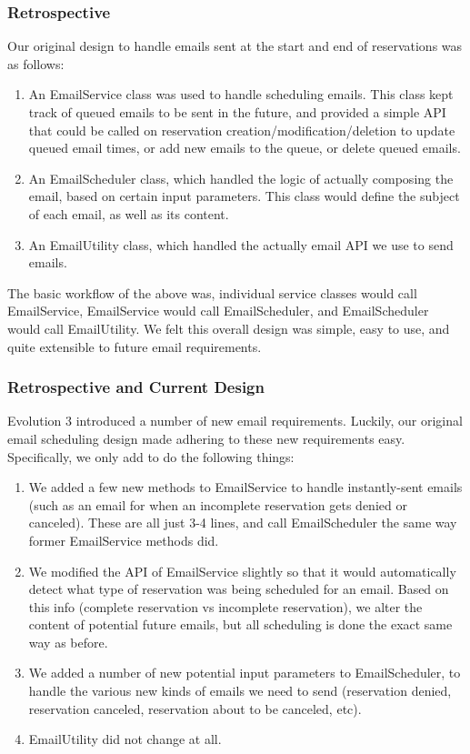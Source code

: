 \documentclass[12pt]{article}
\begin{document}
\subsubsection{Retrospective}
Our original design to handle emails sent at the start and end of reservations was as follows:
\begin{enumerate}
    \item An EmailService class was used to handle scheduling emails. This class kept track of queued emails to be sent in the future, and provided a simple API that could be called on reservation creation/modification/deletion to update queued email times, or add new emails to the queue, or delete queued emails.
    \item An EmailScheduler class, which handled the logic of actually composing the email, based on certain input parameters. This class would define the subject of each email, as well as its content. 
    \item An EmailUtility class, which handled the actually email API we use to send emails. 
\end{enumerate}

The basic workflow of the above was, individual service classes would call EmailService, EmailService would call EmailScheduler, and EmailScheduler would call EmailUtility. We felt this overall design was simple, easy to use, and quite extensible to future email requirements. 

\subsubsection{Retrospective and Current Design}
Evolution 3 introduced a number of new email requirements. Luckily, our original email scheduling design made adhering to these new requirements easy. Specifically, we only add to do the following things:
\begin{enumerate}
    \item We added a few new methods to EmailService to handle instantly-sent emails (such as an email for when an  incomplete reservation gets denied or canceled). These are all just 3-4 lines, and call EmailScheduler the same way former EmailService methods did. 
    \item We modified the API of EmailService slightly so that it would automatically detect what type of reservation was being scheduled for an email. Based on this info (complete reservation vs incomplete reservation), we alter the content of potential future emails, but all scheduling is done the exact same way as before. 
    \item We added a number of new potential input parameters to EmailScheduler, to handle the various new kinds of emails we need to send (reservation denied, reservation canceled, reservation about to be canceled, etc). 
    \item EmailUtility did not change at all. 
\end{enumerate}
\end{document}
